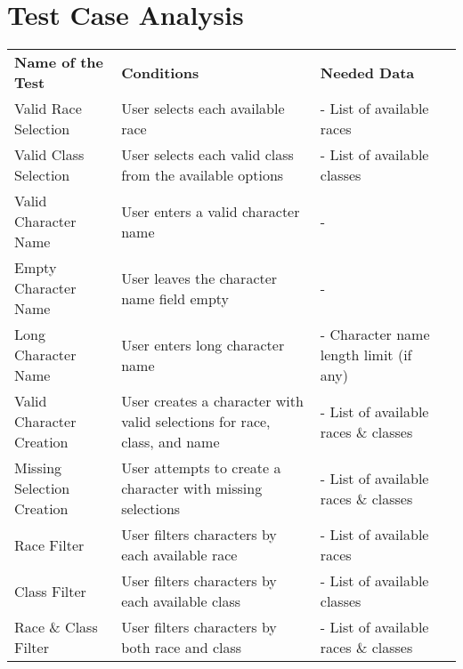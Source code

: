 \documentclass{article}
\begin{document}
\section{Test Case Analysis}
\begin{table}[]
\begin{tabular}{|l|l|l|l}
\cline{1-3}
\textbf{Name of the Test}  & \textbf{Conditions}                                                      & \textbf{Needed Data}                         &  \\ \cline{1-3}
Valid Race Selection       & User selects each available race                                         & - List of available races                    &  \\ \cline{1-3}
Valid Class Selection      & User selects each valid class  from the available options                & - List of available classes                  &  \\ \cline{1-3}
Valid Character Name       & User enters a valid character name                                       & -                                            &  \\ \cline{1-3}
Empty Character Name       & User leaves the character name field empty                               & -                                            &  \\ \cline{1-3}
Long Character Name        & User enters long character name                                          & - Character name length limit (if any)       &  \\ \cline{1-3}
Valid Character Creation   & User creates a character with valid selections for race, class, and name & - List of available races \& classes         &  \\ \cline{1-3}
Missing Selection Creation & User attempts to create a character with missing selections              & - List of available races \& classes         &  \\ \cline{1-3}
Race Filter                & User filters characters by each available race                           & - List of available races                    &  \\ \cline{1-3}
Class Filter               & User filters characters by each available class                          & - List of available classes                  &  \\ \cline{1-3}
Race \& Class Filter       & User filters characters by both race and class                           & - List of available races \& classes         &  \\ \cline{1-3}

\end{tabular}
\end{table}
\end{document}
